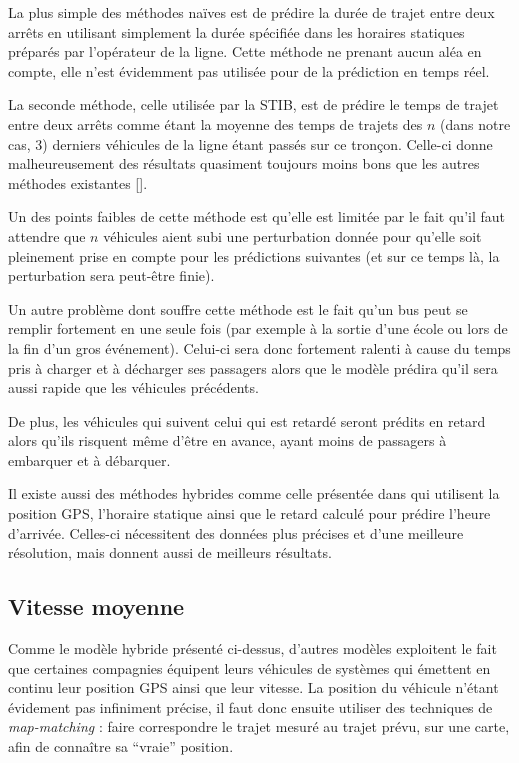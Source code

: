 \documentclass[letterpaper]{article}
\begin{document}
La plus simple des méthodes naïves est de prédire la durée de trajet entre deux arrêts en utilisant simplement la durée spécifiée dans les horaires statiques préparés par l'opérateur de la ligne. Cette méthode ne prenant aucun aléa en compte, elle n'est évidemment pas utilisée pour de la prédiction en temps réel.

La seconde méthode, celle utilisée par la STIB, est de prédire le temps de trajet entre deux arrêts comme étant la moyenne des temps de trajets des $n$ (dans notre cas, 3) derniers véhicules de la ligne étant passés sur ce tronçon. Celle-ci donne malheureusement des résultats quasiment toujours moins bons que les autres méthodes existantes [\cite{Altinkaya2013}].

Un des points faibles de cette méthode est qu'elle est limitée par le fait qu'il faut attendre que $n$ véhicules aient subi une perturbation donnée pour qu'elle soit pleinement prise en compte pour les prédictions suivantes (et sur ce temps là, la perturbation sera peut-être finie).

Un autre problème dont souffre cette méthode est le fait qu'un bus peut se remplir fortement en une seule fois (par exemple à la sortie d'une école ou lors de la fin d'un gros événement). Celui-ci sera donc fortement ralenti à cause du temps pris à charger et à décharger ses passagers alors que le modèle prédira qu'il sera aussi rapide que les véhicules précédents.

De plus, les véhicules qui suivent celui qui est retardé seront prédits en retard alors qu'ils risquent même d'être en avance, ayant moins de passagers à embarquer et à débarquer.

Il existe aussi des méthodes hybrides comme celle présentée dans \cite{lin1999experimental} qui utilisent la position GPS, l'horaire statique ainsi que le retard calculé pour prédire l'heure d'arrivée. Celles-ci nécessitent des données plus précises et d'une meilleure résolution, mais donnent aussi de meilleurs résultats.



\subsection{Vitesse moyenne}

Comme le modèle hybride présenté ci-dessus, d'autres modèles exploitent le fait que certaines compagnies équipent leurs véhicules de systèmes qui émettent en continu leur position GPS ainsi que leur vitesse. La position du véhicule n'étant évidement pas infiniment précise, il faut donc ensuite utiliser des techniques de \textit{map-matching} : faire correspondre le trajet mesuré au trajet prévu, sur une carte, afin de connaître sa ``vraie'' position.
\end{document}
